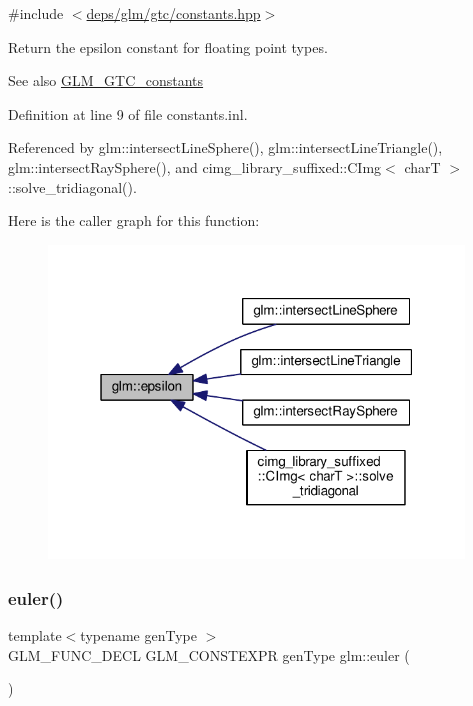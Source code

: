 {\ttfamily \#include $<$\hyperlink{constants_8hpp}{deps/glm/gtc/constants.\+hpp}$>$}

Return the epsilon constant for floating point types. \begin{DoxySeeAlso}{See also}
\hyperlink{group__gtc__constants}{G\+L\+M\+\_\+\+G\+T\+C\+\_\+constants} 
\end{DoxySeeAlso}


Definition at line 9 of file constants.\+inl.



Referenced by glm\+::intersect\+Line\+Sphere(), glm\+::intersect\+Line\+Triangle(), glm\+::intersect\+Ray\+Sphere(), and cimg\+\_\+library\+\_\+suffixed\+::\+C\+Img$<$ char\+T $>$\+::solve\+\_\+tridiagonal().

Here is the caller graph for this function\+:
\nopagebreak
\begin{figure}[H]
\begin{center}
\leavevmode
\includegraphics[width=313pt]{d7/d6f/group__gtc__constants_ga2a1e57fc5592b69cfae84174cbfc9429_icgraph}
\end{center}
\end{figure}
\mbox{\label{group__gtc__constants_gad8fe2e6f90bce9d829e9723b649fbd42}} 
\subsubsection{\texorpdfstring{euler()}{euler()}}
{\footnotesize\ttfamily template$<$typename gen\+Type $>$ \\
G\+L\+M\+\_\+\+F\+U\+N\+C\+\_\+\+D\+E\+CL G\+L\+M\+\_\+\+C\+O\+N\+S\+T\+E\+X\+PR gen\+Type glm\+::euler (\begin{DoxyParamCaption}{ }\end{DoxyParamCaption})}



